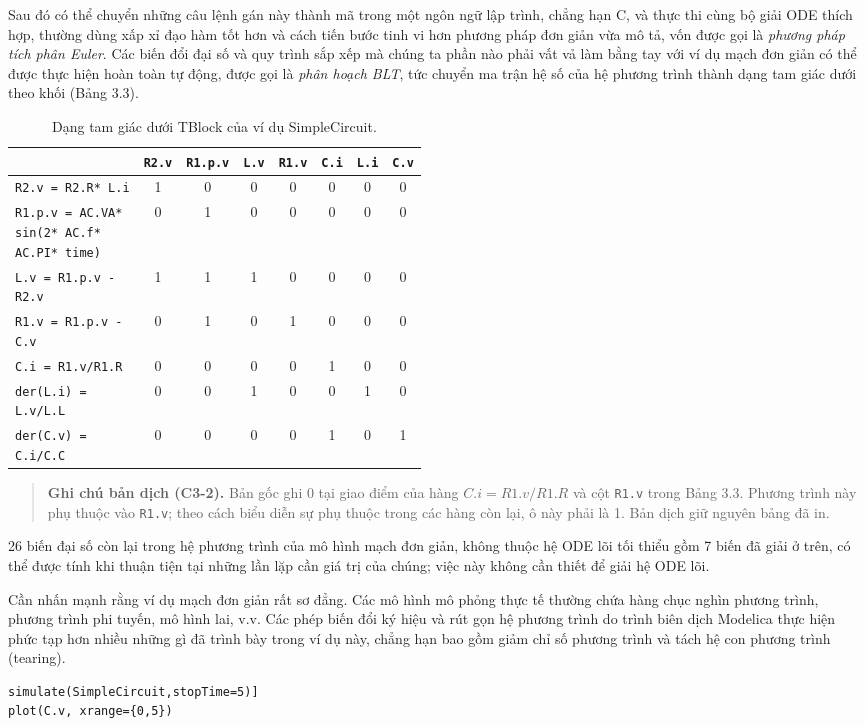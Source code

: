 Sau đó có thể chuyển những câu lệnh gán này thành mã trong một ngôn ngữ lập trình, chẳng hạn C, và thực thi cùng bộ giải ODE thích hợp, thường dùng xấp xỉ đạo hàm tốt hơn và cách tiến bước tinh vi hơn phương pháp đơn giản vừa mô tả, vốn được gọi là \emph{phương pháp tích phân Euler}. Các biến đổi đại số và quy trình sắp xếp mà chúng ta phần nào phải vất vả làm bằng tay với ví dụ mạch đơn giản có thể được thực hiện hoàn toàn tự động, được gọi là \emph{phân hoạch BLT}, tức chuyển ma trận hệ số của hệ phương trình thành dạng tam giác dưới theo khối (Bảng 3.3).
\begin{table}[htbp]
\centering
\small
\begin{tabular}{|p{0.48\linewidth}|*{7}{c|}}
\hline
 &\texttt{R2.v}&\texttt{R1.p.v}&\texttt{L.v}&\texttt{R1.v}&\texttt{C.i}&\texttt{L.i}&\texttt{C.v}\\\hline
\texttt{R2.v = R2.R* L.i}&1&0&0&0&0&0&0\\\hline
\texttt{R1.p.v = AC.VA* sin(2* AC.f* AC.PI* time)}&0&1&0&0&0&0&0\\\hline
\texttt{L.v = R1.p.v - R2.v}&1&1&1&0&0&0&0\\\hline
\texttt{R1.v = R1.p.v - C.v}&0&1&0&1&0&0&0\\\hline
\texttt{C.i = R1.v/R1.R}&0&0&0&0&1&0&0\\\hline
\texttt{der(L.i) = L.v/L.L}&0&0&1&0&0&1&0\\\hline
\texttt{der(C.v) = C.i/C.C}&0&0&0&0&1&0&1\\\hline
\end{tabular}
\caption{Dạng tam giác dưới TBlock của ví dụ SimpleCircuit.}
\end{table}
\begin{quote}
\small\textbf{Ghi chú bản dịch (C3-2).} Bản gốc ghi 0 tại giao điểm của hàng $C.i=R1.v/R1.R$ và cột \texttt{R1.v} trong Bảng 3.3. Phương trình này phụ thuộc vào \texttt{R1.v}; theo cách biểu diễn sự phụ thuộc trong các hàng còn lại, ô này phải là 1. Bản dịch giữ nguyên bảng đã in.
\end{quote}


26 biến đại số còn lại trong hệ phương trình của mô hình mạch đơn giản, không thuộc hệ ODE lõi tối thiểu gồm 7 biến đã giải ở trên, có thể được tính khi thuận tiện tại những lần lặp cần giá trị của chúng; việc này không cần thiết để giải hệ ODE lõi.

Cần nhấn mạnh rằng ví dụ mạch đơn giản rất sơ đẳng. Các mô hình mô phỏng thực tế thường chứa hàng chục nghìn phương trình, phương trình phi tuyến, mô hình lai, v.v. Các phép biến đổi ký hiệu và rút gọn hệ phương trình do trình biên dịch Modelica thực hiện phức tạp hơn nhiều những gì đã trình bày trong ví dụ này, chẳng hạn bao gồm giảm chỉ số phương trình và tách hệ con phương trình (tearing).
\begin{verbatim}
simulate(SimpleCircuit,stopTime=5)]
plot(C.v, xrange={0,5})
\end{verbatim}

